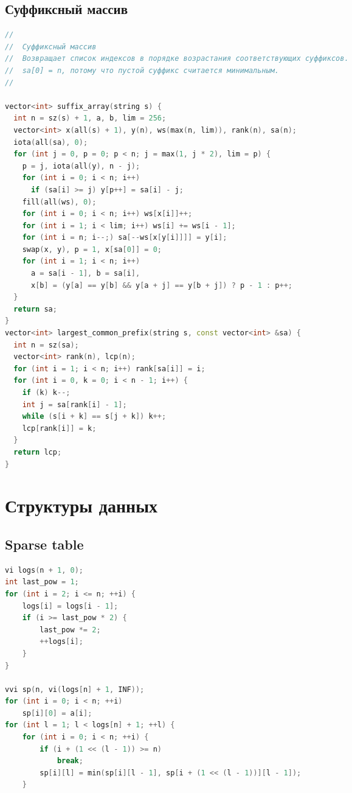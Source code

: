 \documentclass[10pt,a4paper,landscape,twosided]{extarticle}
\begin{document}
\begin{multicols}{3}
\subsection{Суффиксный массив}
\begin{lstlisting}[language=C++]
//
//  Суффиксный массив
//  Возвращает список индексов в порядке возрастания соответствующих суффиксов.
//  sa[0] = n, потому что пустой суффикс считается минимальным.
//

vector<int> suffix_array(string s) {
  int n = sz(s) + 1, a, b, lim = 256;
  vector<int> x(all(s) + 1), y(n), ws(max(n, lim)), rank(n), sa(n);
  iota(all(sa), 0);
  for (int j = 0, p = 0; p < n; j = max(1, j * 2), lim = p) {
    p = j, iota(all(y), n - j);
    for (int i = 0; i < n; i++)
      if (sa[i] >= j) y[p++] = sa[i] - j;
    fill(all(ws), 0);
    for (int i = 0; i < n; i++) ws[x[i]]++;
    for (int i = 1; i < lim; i++) ws[i] += ws[i - 1];
    for (int i = n; i--;) sa[--ws[x[y[i]]]] = y[i];
    swap(x, y), p = 1, x[sa[0]] = 0;
    for (int i = 1; i < n; i++)
      a = sa[i - 1], b = sa[i],
      x[b] = (y[a] == y[b] && y[a + j] == y[b + j]) ? p - 1 : p++;
  }
  return sa;
}
vector<int> largest_common_prefix(string s, const vector<int> &sa) {
  int n = sz(sa);
  vector<int> rank(n), lcp(n);
  for (int i = 1; i < n; i++) rank[sa[i]] = i;
  for (int i = 0, k = 0; i < n - 1; i++) {
    if (k) k--;
    int j = sa[rank[i] - 1];
    while (s[i + k] == s[j + k]) k++;
    lcp[rank[i]] = k;
  }
  return lcp;
}
\end{lstlisting}

\section{Структуры данных}

\subsection{Sparse table}
\begin{lstlisting}[language=C++]
vi logs(n + 1, 0);
int last_pow = 1;
for (int i = 2; i <= n; ++i) {
    logs[i] = logs[i - 1];
    if (i >= last_pow * 2) {
        last_pow *= 2;
        ++logs[i];
    }
}

vvi sp(n, vi(logs[n] + 1, INF));
for (int i = 0; i < n; ++i)
    sp[i][0] = a[i];
for (int l = 1; l < logs[n] + 1; ++l) {
    for (int i = 0; i < n; ++i) {
        if (i + (1 << (l - 1)) >= n)
            break;
        sp[i][l] = min(sp[i][l - 1], sp[i + (1 << (l - 1))][l - 1]);
    }


\end{lstlisting}
\end{multicols}
\end{document}
